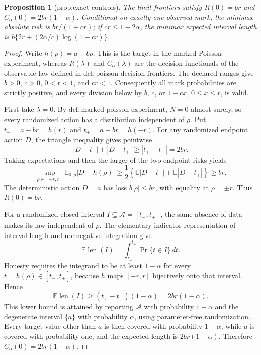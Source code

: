 \documentclass{article}
\newtheorem{proposition}{Proposition}
\begin{document}
\begin{proposition}[prop:exact-controls]\label{prop:exact-controls}
The limit frontiers satisfy \(R(0)=br\) and \(C_\alpha(0)=2br(1-\alpha)\). Conditional on exactly one observed mark, the minimax absolute risk is \(br/(1+cr)\); if \(cr\le1-2\alpha\), the minimax expected interval length is \(b\{2r+(2\alpha/c)\log(1-cr)\}\).
\end{proposition}
\begin{proof}
Write \(h(\rho)=a-b\rho\).  This is the target in the marked-Poisson experiment, whereas \(R(\lambda)\) and \(C_\alpha(\lambda)\) are the decision functionals of the observable law defined in \(\mathrm{def{:}poisson\mbox{-}decision\mbox{-}frontiers}\).  The declared ranges give \(b>0\), \(c>0\), \(0<r<1\), and \(cr<1\).  Consequently all mark probabilities are strictly positive, and every division below by \(b\), \(c\), or \(1-cx\), \(0\leq x\leq r\), is valid.

First take \(\lambda=0\).  By \(\mathrm{def{:}marked\mbox{-}poisson\mbox{-}experiment}\), \(N=0\) almost surely, so every randomized action has a distribution independent of \(\rho\).  Put \(t_-=a-br=h(r)\) and \(t_+=a+br=h(-r)\).  For any randomized endpoint action \(D\), the triangle inequality gives pointwise
\[
 |D-t_-|+|D-t_+|\geq |t_+-t_-|=2br.
\]
Taking expectations and then the larger of the two endpoint risks yields
\[
 \sup_{\rho\in[-r,r]}\mathbb E_{0,\rho}|D-h(\rho)|
 \geq \frac12\left\{\mathbb E|D-t_-|+\mathbb E|D-t_+|\right\}
 \geq br.
\]
The deterministic action \(D=a\) has loss \(b|\rho|\leq br\), with equality at \(\rho=\pm r\).  Thus \(R(0)=br\).

For a randomized closed interval \(I\subseteq\mathcal A=[t_-,t_+]\), the same absence of data makes its law independent of \(\rho\).  The elementary indicator representation of interval length and nonnegative integration give
\[
 \mathbb E\operatorname{len}(I)
 =\int_{t_-}^{t_+}\Pr\{t\in I\}\,dt.
\]
Honesty requires the integrand to be at least \(1-\alpha\) for every \(t=h(\rho)\in[t_-,t_+]\), because \(h\) maps \([-r,r]\) bijectively onto that interval.  Hence
\[
 \mathbb E\operatorname{len}(I)\geq (t_+-t_-)(1-\alpha)=2br(1-\alpha).
\]
This lower bound is attained by reporting \(\mathcal A\) with probability \(1-\alpha\) and the degenerate interval \(\{a\}\) with probability \(\alpha\), using parameter-free randomization.  Every target value other than \(a\) is then covered with probability \(1-\alpha\), while \(a\) is covered with probability one, and the expected length is \(2br(1-\alpha)\).  Therefore \(C_\alpha(0)=2br(1-\alpha)\).


\end{proof}
\end{document}
